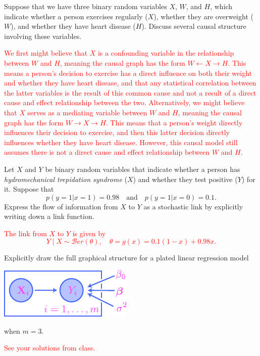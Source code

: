 \documentclass[12pt,reqno]{amsart}
\begin{document}
\bigskip

\prob Suppose that we have three binary random variables $X$, $W$, and $H$, which indicate whether a person exercises regularly ($X$), whether they are overweight ($W$), and whether they have heart disease ($H$). Discuss several causal structure involving these variables.

\bigskip
\textcolor{red}{We first might believe that $X$ is a confounding variable in the relationship between $W$ and $H$, meaning the causal graph has the form $W \leftarrow X \rightarrow H$. This means a person's decision to exercise has a direct influence on both their weight and whether they have heart disease, and that any statistical correlation between the latter variables is the result of this common cause and not a result of a direct cause and effect relationship between the two. Alternatively, we might believe that $X$ serves as a mediating variable between $W$ and $H$, meaning the causal graph has the form $W \to X \to H$. This means that a person's weight directly influences their decision to exercise, and then this latter decision directly influences whether they have heart disease. However, this causal model still assumes there is not a direct cause and effect relationship between $W$ and $H$.}
\bigskip













\prob Let $X$ and $Y$ be binary random variables that indicate whether a person has \textit{hydromechanical trepidation syndrome} ($X$) and whether they test positive ($Y$) for it. Suppose that
	\[p(y=1 |x=1) = 0.98 \quad \text{and} \quad p(y=1 | x=0) = 0.1.
	\]
Express the flow of information from $X$ to $Y$ as a stochastic link by explicitly writing down a link function.

\bigskip
\textcolor{red}{The link from $X$ to $Y$ is given by
	\[Y \mid X \sim \mathcal{B}er(\theta), \quad \theta = g(x) = 0.1(1-x) + 0.98x.
	\]}
\bigskip
	







\prob Explicitly draw the full graphical structure for a plated linear regression model

\bigskip
\begin{center}
\includegraphics[scale=1.5]{lin-reg-00-plated.pdf}
\end{center}
\bigskip

when $m=3$.

\bigskip
\textcolor{red}{See your solutions from class.}
\bigskip
\end{document}
